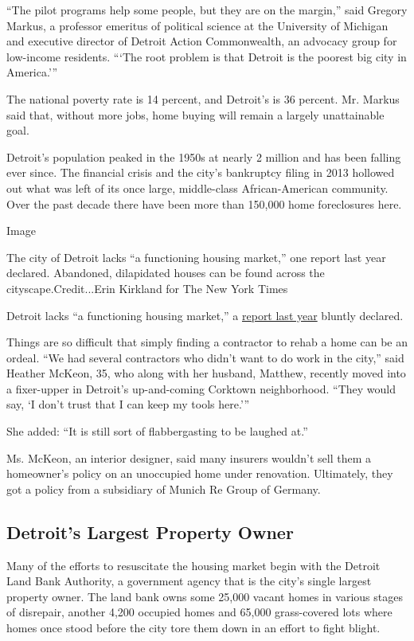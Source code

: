 ``The pilot programs help some people, but they are on the margin,''
said Gregory Markus, a professor emeritus of political science at the
University of Michigan and executive director of Detroit Action
Commonwealth, an advocacy group for low-income residents. ```The root
problem is that Detroit is the poorest big city in America.'''

The national poverty rate is 14 percent, and Detroit's is 36 percent.
Mr. Markus said that, without more jobs, home buying will remain a
largely unattainable goal.

Detroit's population peaked in the 1950s at nearly 2 million and has
been falling ever since. The financial crisis and the city's bankruptcy
filing in 2013 hollowed out what was left of its once large,
middle-class African-American community. Over the past decade there have
been more than 150,000 home foreclosures here.

Image

The city of Detroit lacks ``a functioning housing market,'' one report
last year declared. Abandoned, dilapidated houses can be found across
the cityscape.Credit...Erin Kirkland for The New York Times

Detroit lacks ``a functioning housing market,'' a
\href{http://crfusa.com/uploaded/Doc/detroit_homebuying_ecosystem_strategies_final_28_dec_2016_3b2bf0.pdf}{report
last year} bluntly declared.

Things are so difficult that simply finding a contractor to rehab a home
can be an ordeal. ``We had several contractors who didn't want to do
work in the city,'' said Heather McKeon, 35, who along with her husband,
Matthew, recently moved into a fixer-upper in Detroit's up-and-coming
Corktown neighborhood. ``They would say, `I don't trust that I can keep
my tools here.'''

She added: ``It is still sort of flabbergasting to be laughed at.''

Ms. McKeon, an interior designer, said many insurers wouldn't sell them
a homeowner's policy on an unoccupied home under renovation. Ultimately,
they got a policy from a subsidiary of Munich Re Group of Germany.

\hypertarget{detroits-largest-property-owner}{%
\subsection{Detroit's Largest Property
Owner}\label{detroits-largest-property-owner}}

Many of the efforts to resuscitate the housing market begin with the
Detroit Land Bank Authority, a government agency that is the city's
single largest property owner. The land bank owns some 25,000 vacant
homes in various stages of disrepair, another 4,200 occupied homes and
65,000 grass-covered lots where homes once stood before the city tore
them down in an effort to fight blight.

